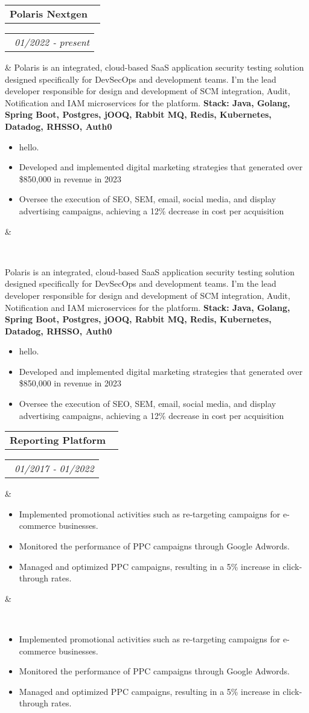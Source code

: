 \documentclass[14pt,a4paper,sans]{moderncv}
\makeatletter
\newcommand{\projectdesc}[1]{\fontsize{1.2em}{8em}\selectfont #1}
\newcommand*{\customcventry}[7][.13em]{
    \begin{tabular}{@{}l}
    {\bfseries #4} \
        {\itshape #3}
    \end{tabular}
    \hfill
    \begin{tabular}{l@{}}
    {\bfseries #5} \
        {\itshape #2}
    \end{tabular}
    \ifx
        &#7&%
    \else
            {\
        \begin{minipage}{\maincolumnwidth}%
        \small#7%
        \end{minipage}}
    \fi%
    \par\addvspace{#1}}
\makeatother
\begin{document}
    \customcventry{01/2022 ‐ present}{{\color{blue}{(Synopsys Canada)}}}{Polaris Nextgen}{}{}{
            {\projectdesc{Polaris is an integrated, cloud-based SaaS application security testing solution designed specifically for DevSecOps and development teams.
        I'm the lead developer responsible for design and development of SCM integration, Audit, Notification and IAM microservices for the platform.\newline{}}}
            {\textbf{Stack: Java, Golang, Spring Boot, Postgres, jOOQ, Rabbit MQ, Redis, Kubernetes, Datadog, RHSSO, Auth0 }
        }
            {\begin{itemize}[leftmargin=0.6cm, label={\textbullet}]
                 \item hello.
                 \item Developed and implemented digital marketing strategies that generated over \$850,000 in revenue in 2023
                 \item Oversee the execution of SEO, SEM, email, social media, and display advertising campaigns, achieving a 12\% decrease in cost per acquisition
        \end{itemize}}}

    \vspace{1em}
    \customcventry{01/2017 ‐ 01/2022}{{\color{blue}{(Synopsys India)}}}{Reporting Platform}{}{}{
            {\begin{itemize}[leftmargin=0.6cm, label={\textbullet}]
                 \item Implemented promotional activities such as re-targeting campaigns for e-commerce businesses.
                 \item Monitored the performance of PPC campaigns through Google Adwords.
                 \item Managed and optimized PPC campaigns, resulting in a 5\% increase in click-through rates.
        \end{itemize}}}

    \vspace{1em}
\end{document}
